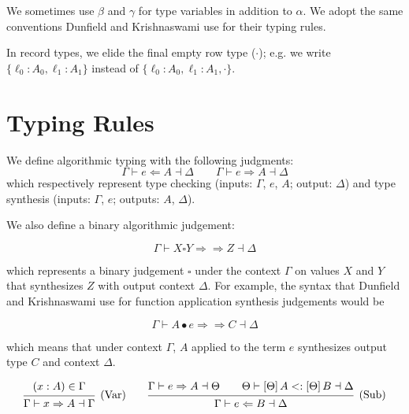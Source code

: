 \documentclass{article}
\newcommand{\subsume}{<:}
\newcommand{\synthesizes}{\Rightarrow \!\!\! \Rightarrow}
\newcommand{\app}{\bullet}
\newcommand{\spc}{\qquad}
\newcommand{\apply}[1]{\left[#1\right]}
\newcommand{\synth}[4]{#1 \vdash #2 \Rightarrow #3 \dashv #4}
\renewcommand{\check}[4]{#1 \vdash #2 \Leftarrow #3 \dashv #4}
\newcommand{\presynth}[6]{#1 \vdash #2 #3 #4 \synthesizes #5 \dashv #6}
\newcommand{\subsumes}[4]{#1 \vdash #2 \subsume #3 \dashv #4}
\newcommand{\deduct}[3][]
{
  \begin{prooftree}
    \hypo{#2}
    \infer1[\text{#1}]{#3}
  \end{prooftree}
}
\begin{document}
We sometimes use $\beta$ and $\gamma$ for type variables in addition
to $\alpha$. We adopt the same
conventions Dunfield and Krishnaswami use for their typing rules.

In record types, we elide the final empty row type
($\cdot$); e.g. we write $\{\ell_0 : A_0, \ell_1 : A_1\}$ instead of $\{\ell_0 : A_0, \ell_1 : A_1, \cdot\}$.


\section{Typing Rules}
We define algorithmic typing with the following judgments:
\[
\check{\Gamma}{e}{A}{\Delta}
\spc
\synth{\Gamma}{e}{A}{\Delta}
\]
which respectively represent type checking (inputs: $\Gamma$, $e$, $A$; output: $\Delta$) and type synthesis (inputs: $\Gamma$, $e$; outputs: $A$, $\Delta$).

We also define a binary algorithmic judgement:

\[
\presynth{\Gamma}{X}{\square}{Y}{Z}{\Delta}
\]

which represents a binary judgement \(\square\) under the context \(\Gamma\) on
values \(X\) and \(Y\) that synthesizes \(Z\) with output context \(\Delta\).
For example, the syntax that Dunfield and Krishnaswami use for function
application synthesis judgements would be

\[
\presynth \Gamma A \app e C \Delta
\]

which means that under context \(\Gamma\), \(A\) applied to the term \(e\)
synthesizes output type \(C\) and context \(\Delta\).

\[
  \deduct[(Var)]
  {
    (x : A) \in \Gamma
  }
  { \synth{\Gamma}{x}{A}{\Gamma} }
  \spc
  \deduct[(Sub)]
  {
    \synth{\Gamma}{e}{A}{\Theta} \spc
    \subsumes{\Theta}{\apply\Theta A}{\apply\Theta B}{\Delta}
  }
  { \check{\Gamma}{e}{B}{\Delta} }
\]
\end{document}
